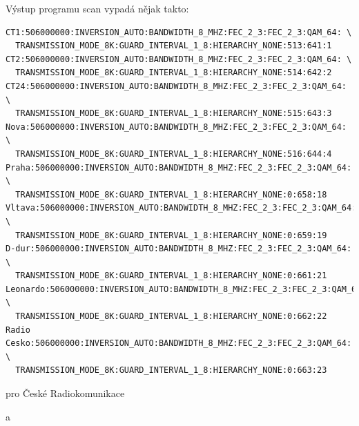 \vspace{10pt}

Výstup programu scan vypadá nějak takto:
 
\vspace{10pt}

\begin{small}
\begin{verbatim}
CT1:506000000:INVERSION_AUTO:BANDWIDTH_8_MHZ:FEC_2_3:FEC_2_3:QAM_64: \
  TRANSMISSION_MODE_8K:GUARD_INTERVAL_1_8:HIERARCHY_NONE:513:641:1
CT2:506000000:INVERSION_AUTO:BANDWIDTH_8_MHZ:FEC_2_3:FEC_2_3:QAM_64: \
  TRANSMISSION_MODE_8K:GUARD_INTERVAL_1_8:HIERARCHY_NONE:514:642:2
CT24:506000000:INVERSION_AUTO:BANDWIDTH_8_MHZ:FEC_2_3:FEC_2_3:QAM_64: \
  TRANSMISSION_MODE_8K:GUARD_INTERVAL_1_8:HIERARCHY_NONE:515:643:3
Nova:506000000:INVERSION_AUTO:BANDWIDTH_8_MHZ:FEC_2_3:FEC_2_3:QAM_64: \
  TRANSMISSION_MODE_8K:GUARD_INTERVAL_1_8:HIERARCHY_NONE:516:644:4
Praha:506000000:INVERSION_AUTO:BANDWIDTH_8_MHZ:FEC_2_3:FEC_2_3:QAM_64: \
  TRANSMISSION_MODE_8K:GUARD_INTERVAL_1_8:HIERARCHY_NONE:0:658:18
Vltava:506000000:INVERSION_AUTO:BANDWIDTH_8_MHZ:FEC_2_3:FEC_2_3:QAM_64: \
  TRANSMISSION_MODE_8K:GUARD_INTERVAL_1_8:HIERARCHY_NONE:0:659:19
D-dur:506000000:INVERSION_AUTO:BANDWIDTH_8_MHZ:FEC_2_3:FEC_2_3:QAM_64: \
  TRANSMISSION_MODE_8K:GUARD_INTERVAL_1_8:HIERARCHY_NONE:0:661:21
Leonardo:506000000:INVERSION_AUTO:BANDWIDTH_8_MHZ:FEC_2_3:FEC_2_3:QAM_64: \
  TRANSMISSION_MODE_8K:GUARD_INTERVAL_1_8:HIERARCHY_NONE:0:662:22
Radio Cesko:506000000:INVERSION_AUTO:BANDWIDTH_8_MHZ:FEC_2_3:FEC_2_3:QAM_64: \
  TRANSMISSION_MODE_8K:GUARD_INTERVAL_1_8:HIERARCHY_NONE:0:663:23
\end{verbatim}
\end{small}

\vspace{10pt}

pro České Radiokomunikace

\vspace{10pt}

a

\vspace{10pt}

